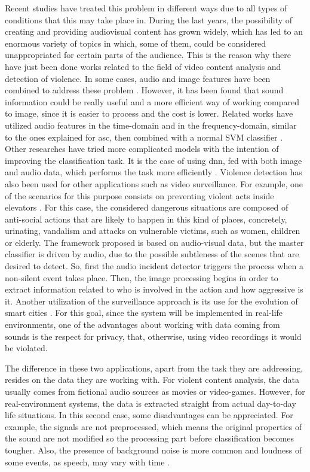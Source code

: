 	Recent studies have treated this problem in different ways due to all types of conditions that this may take place in. During the last years, the possibility of creating and providing audiovisual content has grown widely, which has led to an enormous variety of topics in which, some of them, could be considered unappropriated for certain parts of the audience. This is the reason why there have just been done works related to the field of video content analysis and detection of violence. In some cases, audio and image features have been combined to address these problem \cite{Giannakopoulos2010}. However, it has been found that sound information could be really useful and a more efficient way of working compared to image, since it is easier to process and the cost is lower. Related works have utilized audio features in the time-domain and in the frequency-domain, similar to the ones explained for \acrshort{asc}, then combined with a normal SVM classifier \cite{Giannakopoulos2006}. Other researches have tried more complicated models with the intention of improving the classification task. It is the case of using \acrshort{dnn}, fed with both image and audio data, which performs the task more efficiently \cite{Ali2018}. Violence detection has also been used for other applications such as video surveillance. For example, one of the scenarios for this purpose consists on preventing violent acts inside elevators \cite{Chua2014}. For this case, the considered dangerous situations are composed of anti-social actions that are likely to happen in this kind of places, concretely, urinating, vandalism and attacks on vulnerable victims, such as women, children or elderly. The framework proposed is based on audio-visual data, but the master classifier is driven by audio, due to the possible subtleness of the scenes that are desired to detect. So, first the audio incident detector triggers the process when a non-silent event takes place. Then, the image processing begins in order to extract information related to who is involved in the action and how aggressive is it. Another utilization of the surveillance approach is its use for the evolution of smart cities \cite{Garcia-Gomez2016}. For this goal, since the system will be implemented in real-life environments, one of the advantages about working with data coming from sounds is the respect for privacy, that, otherwise, using video recordings it would be violated.
	
	The difference in these two applications, apart from the task they are addressing, resides on the data they are working with. For violent content analysis, the data usually comes from fictional audio sources as movies or video-games. However, for real-environment systems, the data is extracted straight from actual day-to-day life situations. In this second case, some disadvantages can be appreciated. For example, the signals are not preprocessed, which means the original properties of the sound are not modified so the processing part before classification becomes tougher. Also, the presence of background noise is more common and loudness of some events, as speech, may vary with time \cite{Bautista-Duran2017}. 

